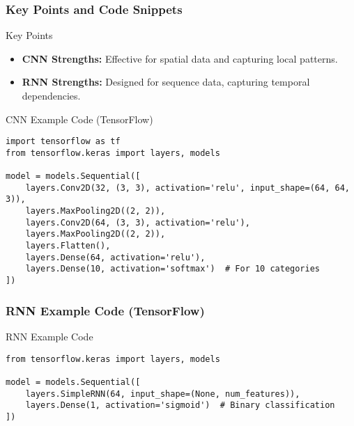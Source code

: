 \documentclass{beamer}
\begin{document}
\begin{frame}[fragile]
    \frametitle{Key Points and Code Snippets}
    
    \begin{block}{Key Points}
        \begin{itemize}
            \item \textbf{CNN Strengths:} Effective for spatial data and capturing local patterns.
            \item \textbf{RNN Strengths:} Designed for sequence data, capturing temporal dependencies.
        \end{itemize}
    \end{block}

    \begin{block}{CNN Example Code (TensorFlow)}
        \begin{lstlisting}
import tensorflow as tf
from tensorflow.keras import layers, models

model = models.Sequential([
    layers.Conv2D(32, (3, 3), activation='relu', input_shape=(64, 64, 3)),
    layers.MaxPooling2D((2, 2)),
    layers.Conv2D(64, (3, 3), activation='relu'),
    layers.MaxPooling2D((2, 2)),
    layers.Flatten(),
    layers.Dense(64, activation='relu'),
    layers.Dense(10, activation='softmax')  # For 10 categories
])
        \end{lstlisting}
    \end{block}

\end{frame}

\begin{frame}[fragile]
    \frametitle{RNN Example Code (TensorFlow)}
    
    \begin{block}{RNN Example Code}
        \begin{lstlisting}
from tensorflow.keras import layers, models

model = models.Sequential([
    layers.SimpleRNN(64, input_shape=(None, num_features)),
    layers.Dense(1, activation='sigmoid')  # Binary classification
])
        \end{lstlisting}
    \end{block}
    
\end{frame}
\end{document}
